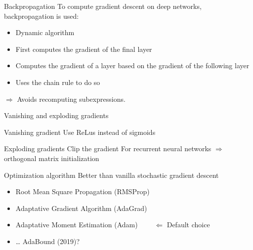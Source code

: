 \begin{frame}{Backpropagation}
  To compute gradient descent on deep networks, backpropagation is used:

  \begin{itemize}
    \item Dynamic algorithm
    \item First computes the gradient of the final layer
    \item Computes the gradient of a layer based on the gradient of the following layer
    \item Uses the chain rule to do so
  \end{itemize}

  $\Rightarrow$ Avoids recomputing subexpressions.
\end{frame}

\begin{frame}{Vanishing and exploding gradients}
\end{frame}

\begin{frame}{Vanishing gradient}
  Use ReLus instead of sigmoids
  \vfill
\end{frame}

\begin{frame}{Exploding gradients}
  Clip the gradient
  For recurrent neural networks $\Rightarrow$ orthogonal matrix initialization
\end{frame}

\begin{frame}{Optimization algorithm}
  Better than vanilla stochastic gradient descent
  \begin{itemize}[<+(1)->]
    \item Root Mean Square Propagation (RMSProp)
    \item Adaptative Gradient Algorithm (AdaGrad)
    \item Adaptative Moment Estimation (Adam)    $\qquad\Leftarrow$ Default choice
    \item … AdaBound (2019)?
  \end{itemize}
\end{frame}

